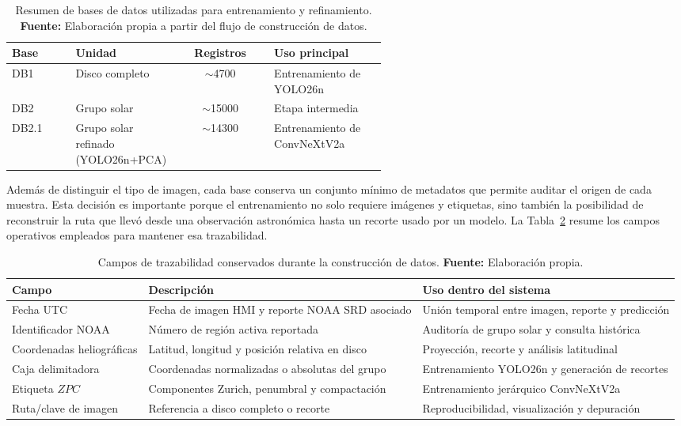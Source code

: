 \begin{table}[H]
    \centering
    \caption{Resumen de bases de datos utilizadas para entrenamiento y refinamiento. \textbf{Fuente:} Elaboración propia a partir del flujo de construcción de datos.}
    \label{tab:resumen-bases-datos}
    \scriptsize
    \begin{tabular}{lp{0.25\linewidth}cp{0.30\linewidth}}
        \toprule
        \textbf{Base} & \textbf{Unidad} & \textbf{Registros} & \textbf{Uso principal} \\
        \midrule
        DB1 & Disco completo & $\sim$4700 & Entrenamiento de YOLO26n \\
        DB2 & Grupo solar & $\sim$15000 & Etapa intermedia \\
        DB2.1 & Grupo solar refinado (YOLO26n+PCA) & $\sim$14300 & Entrenamiento de ConvNeXtV2a \\
        \bottomrule
    \end{tabular}
\end{table}

Además de distinguir el tipo de imagen, cada base conserva un conjunto mínimo de
metadatos que permite auditar el origen de cada muestra. Esta decisión es
importante porque el entrenamiento no solo requiere imágenes y etiquetas, sino
también la posibilidad de reconstruir la ruta que llevó desde una observación
astronómica hasta un recorte usado por un modelo. La Tabla~\ref{tab:trazabilidad-datos}
resume los campos operativos empleados para mantener esa trazabilidad.

\begin{table}[H]
\centering
\caption{Campos de trazabilidad conservados durante la construcción de datos. \textbf{Fuente:} Elaboración propia.}
\label{tab:trazabilidad-datos}
\scriptsize
\begin{tabular}{p{}p{}p{}}
\toprule
\textbf{Campo} & \textbf{Descripción} & \textbf{Uso dentro del sistema} \\
\midrule
Fecha UTC & Fecha de imagen HMI y reporte NOAA SRD asociado & Unión temporal entre imagen, reporte y predicción \\
Identificador NOAA & Número de región activa reportada & Auditoría de grupo solar y consulta histórica \\
Coordenadas heliográficas & Latitud, longitud y posición relativa en disco & Proyección, recorte y análisis latitudinal \\
Caja delimitadora & Coordenadas normalizadas o absolutas del grupo & Entrenamiento YOLO26n y generación de recortes \\
Etiqueta $ZPC$ & Componentes Zurich, penumbral y compactación & Entrenamiento jerárquico ConvNeXtV2a \\
Ruta/clave de imagen & Referencia a disco completo o recorte & Reproducibilidad, visualización y depuración \\
\bottomrule
\end{tabular}
\end{table}

